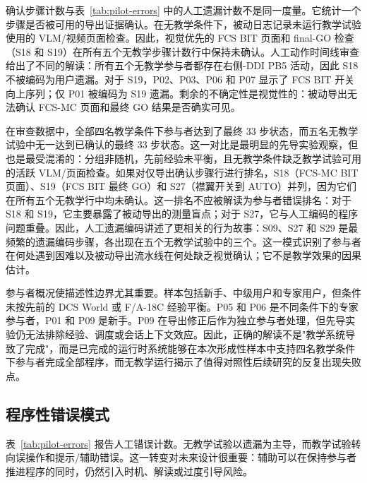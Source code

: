 确认步骤计数与表~\ref{tab:pilot-errors} 中的人工遗漏计数不是同一度量。它统计一个步骤是否被可用的导出证据确认。在无教学条件下，被动日志记录未运行教学试验使用的 VLM/视频页面检查。因此，视觉优先的 FCS BIT 页面和 final-GO 检查（S18 和 S19）在所有五个无教学步骤计数行中保持未确认。人工动作时间线审查给出了不同的解读：所有五个无教学参与者都存在右侧-DDI PB5 活动，因此 S18 不被编码为用户遗漏。对于 S19，P02、P03、P06 和 P07 显示了 FCS BIT 开关向上序列；仅 P01 被编码为 S19 遗漏。剩余的不确定性是视觉性的：被动导出无法确认 FCS-MC 页面和最终 GO 结果是否确实可见。

在审查数据中，全部四名教学条件下参与者达到了最终 33 步状态，而五名无教学试验中无一达到已确认的最终 33 步状态。这一对比是最明显的先导实验观察，但也是最受混淆的：分组非随机，先前经验未平衡，且无教学条件缺乏教学试验可用的活跃 VLM/页面检查。如果对仅导出确认步骤行进行排名，S18（FCS-MC BIT 页面）、S19（FCS BIT 最终 GO）和 S27（襟翼开关到 AUTO）并列，因为它们在所有五个无教学行中均未确认。这一排名不应被解读为参与者错误排名：对于 S18 和 S19，它主要暴露了被动导出的测量盲点；对于 S27，它与人工编码的程序问题重叠。因此，人工遗漏编码讲述了更相关的行为故事：S09、S27 和 S29 是最频繁的遗漏编码步骤，各出现在五个无教学试验中的三个。这一模式识别了参与者在何处遇到困难以及被动导出流水线在何处缺乏视觉确认；它不是教学效果的因果估计。

参与者概况使描述性边界尤其重要。样本包括新手、中级用户和专家用户，但条件未按先前的 DCS World 或 F/A-18C 经验平衡。P05 和 P06 是不同条件下的专家参与者，P01 和 P09 是新手。P09 在导出修正后作为独立参与者处理，但先导实验仍无法排除经验、调度或会话上下文效应。因此，正确的解读不是"教学系统导致了完成"，而是已完成的运行时系统能够在本次形成性样本中支持四名教学条件下参与者完成全部程序，而无教学运行揭示了值得对照性后续研究的反复出现失败点。

\subsection{程序性错误模式}

表~\ref{tab:pilot-errors} 报告人工错误计数。无教学试验以遗漏为主导，而教学试验转向误操作和提示/辅助错误。这一转变对未来设计很重要：辅助可以在保持参与者推进程序的同时，仍然引入时机、解读或过度引导风险。

